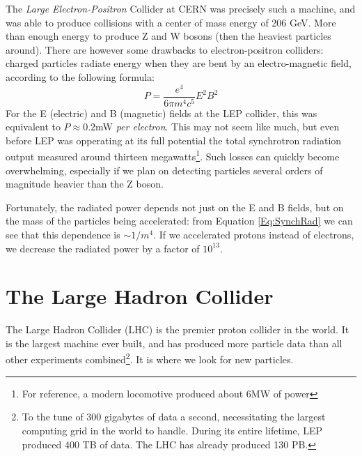 The \textit{Large Electron-Positron} Collider at CERN was precisely such a machine, and was able to produce collisions with a center of mass energy of 206 GeV. More than enough energy to produce Z and W bosons (then the heaviest particles around). There are however some drawbacks to electron-positron colliders: charged particles radiate energy when they are bent by an electro-magnetic field, according to the following formula:
\begin{equation}\label{Eq:SynchRad}
    P = \frac{e^4}{6\pi m^4c^5}E^2B^2
\end{equation}
For the E (electric) and B (magnetic) fields at the LEP collider, this was equivalent to $P \approx 0.2$mW \textit{per electron}. This may not seem like much, but even before LEP was opperating at its full potential the total synchrotron radiation output measured around thirteen megawatts\footnote{For reference, a modern locomotive produced about 6MW of power}. Such losses can quickly become overwhelming, especially if we plan on detecting particles several orders of magnitude heavier than the Z boson.

Fortunately, the radiated power depends not just on the E and B fields, but on the mass of the particles being accelerated: from Equation \ref{Eq:SynchRad} we can see that this dependence is $\sim 1/m^4$. If we accelerated protons instead of electrons, we decrease the radiated power by a factor of $10^{13}$.

\section{The Large Hadron Collider}
The Large Hadron Collider (LHC)\cite{lhcbrochure} is the premier proton collider in the world. It is the largest machine ever built, and has produced more particle data than all other experiments combined\footnote{To the tune of 300 gigabytes of data a second, necessitating the largest computing grid in the world to handle. During its entire lifetime, LEP produced 400 TB of data. The LHC has already produced 130 PB.}. It is where we look for new particles.

